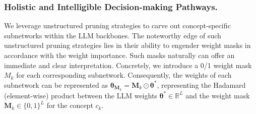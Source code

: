 \documentclass[letterpaper]{article} %
\begin{document}
\subsubsection{Holistic and Intelligible Decision-making Pathways.}

We leverage unstructured pruning strategies to carve out concept-specific subnetworks within the LLM backbones. The noteworthy edge of such unstructured pruning strategies lies in their ability to engender weight masks in accordance with the weight importance. Such masks naturally can offer an immediate and clear interpretation. Concretely, we introduce a 0/1 weight mask $M_k$ for each corresponding subnetwork. Consequently, the weights of each subnetwork can be represented as $\bm{\theta}_{\bm{M}_k} = \bm{M}_k \odot \bm{\theta}^\ast$, representing the Hadamard (element-wise) product between the LLM weights $\bm{\theta}^{\ast} \in \mathbb{R}^L$ and the weight mask $\bm{M}_k \in \{0,1\}^L$ for the concept $c_k$.
\end{document}
